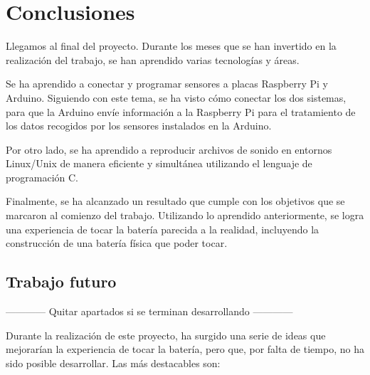 
\chapter{Conclusiones}
\label{cha:Conclusiones}

    Llegamos al final del proyecto. Durante los meses que se han invertido en la realización del trabajo, se han
    aprendido varias tecnologías y áreas.

    Se ha aprendido a conectar y programar sensores a placas Raspberry Pi y Arduino. Siguiendo con este tema, se ha
    visto cómo conectar los dos sistemas, para que la Arduino envíe información a la Raspberry Pi para el tratamiento de
    los datos recogidos por los sensores instalados en la Arduino.

    Por otro lado, se ha aprendido a reproducir archivos de sonido en entornos Linux/Unix de manera eficiente y
    simultánea utilizando el lenguaje de programación C.

    Finalmente, se ha alcanzado un resultado que cumple con los objetivos que se marcaron al comienzo del trabajo.
    Utilizando lo aprendido anteriormente, se logra una experiencia de tocar la batería parecida a la realidad,
    incluyendo la construcción de una batería física que poder tocar.

    \section{Trabajo futuro} %
    \label{sec:TrabajoFuturo}

        ------------ Quitar apartados si se terminan desarrollando ------------

        Durante la realización de este proyecto, ha surgido una serie de ideas que mejorarían la experiencia de tocar la
        batería, pero que, por falta de tiempo, no ha sido posible desarrollar. Las más destacables son:

